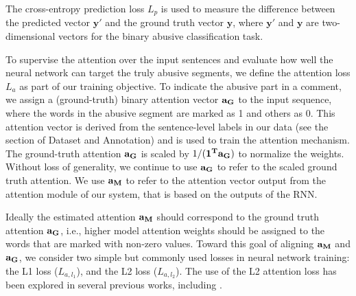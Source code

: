 \documentclass[letterpaper]{article} %
\begin{document}
The cross-entropy prediction loss $L_{p}$ is used to measure the difference between the predicted vector $\mathbf{y}'$ and the ground truth vector $\mathbf{y}$, where $\mathbf{y}'$ and $\mathbf{y}$ are two-dimensional vectors for the binary abusive classification task.

To supervise the attention over the input sentences and evaluate how well the neural network can target the truly abusive segments, we define the attention loss $L_{a}$ as part of our training objective. To indicate the abusive part in a comment, we assign a (ground-truth) binary attention vector $\bf{a}_{G}$ to the input sequence, where the words in the abusive segment are marked as 1 and others as 0. This attention vector is derived from the sentence-level labels in our data (see the section of Dataset and Annotation) and is used to train the attention mechanism. The ground-truth attention $\bf{a}_{G}$ is scaled by $1/(\bf{1}^{T}\bf{a}_{G})$ to normalize the weights. Without loss of generality, we continue to use $\bf{a}_{G}$ to refer to the scaled ground truth attention.  We use $\bf{a}_{M}$ to refer to  the attention vector output from the attention module of our system, that is   based on the outputs of the RNN.

Ideally the estimated attention $\bf{a}_{M}$ should correspond to the ground truth attention $\bf{a}_{G}$, i.e., higher model attention weights should be assigned to the words that are marked with non-zero values. Toward this goal of aligning $\bf{a}_{M}$ and  $\bf{a}_{G}$, we consider two simple but commonly used losses in neural network training: the L1 loss ($L_{a,l_1}$), and the L2 loss ($L_{a,l_2}$). The use of the L2 attention loss has been  explored in several previous works, including \cite{liu2016neural,liu2017exploiting}.

\begin{table}[htbp!]
\captionsetup{font=normalsize}
\centering
{}
\caption{Abusive language detection performance. C:  using only comment labels, and C+S:  using comment and sentence labels. }
\label{tab:detection_performance}
\end{table}
\end{document}
